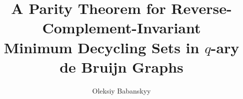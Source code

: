 \documentclass[11pt,a4paper]{article}
\title{A Parity Theorem for Reverse-Complement-Invariant\\
Minimum Decycling Sets in $q$-ary de Bruijn Graphs}
\author{Oleksiy Babanskyy}
\date{}
\begin{document}
\maketitle


\tableofcontents












\appendix




\begingroup
\footnotesize


\endgroup
\end{document}
